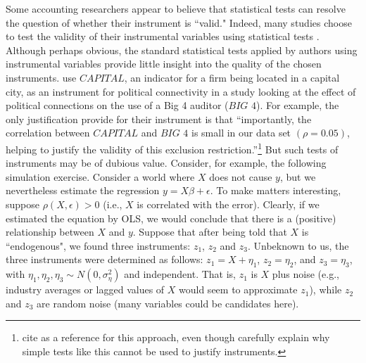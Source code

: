 \documentclass[12pt,reqno,titlepage]{amsart}
\begin{document}
\begin{doublespace}
Some accounting researchers appear to believe that statistical tests can resolve the question of whether their instrument is ``valid."
Indeed, many studies choose to test the validity of their instrumental variables using statistical tests \citep[see][]{Larcker:2010fq}.
%
Although perhaps obvious, the standard statistical tests applied by authors using instrumental variables provide little insight into the quality of the chosen instruments. 
 \citet{Guedhami:2013cj} use $\textit{CAPITAL}$, an indicator for a firm being located in a capital city, as an instrument for political connectivity in a study looking at the effect of political connections on the use of a Big 4 auditor ($\textit{BIG 4}$).
For example, the only justification \citet{Guedhami:2013cj} provide for their instrument is that ``importantly, the correlation between $\textit{CAPITAL}$ and $\textit{BIG 4}$ is small in our data set $(\rho = 0.05)$, helping to justify the validity of this exclusion restriction.''\footnote{
\citet{Guedhami:2013cj} cite \citet{Larcker:2010fq} as a reference for this approach, even though \citet{Larcker:2010fq} carefully explain why simple tests like this cannot be used to justify instruments.}
%
But such tests of instruments may be of dubious value. 
Consider, for example, the following simulation exercise.
Consider a world where $X$ does not cause $y$, but we nevertheless estimate the regression $y = X \beta + \epsilon$. To make matters
interesting, suppose $\rho(X, \epsilon) > 0$ (i.e., $X$ is correlated with the error). Clearly, if we estimated the equation by OLS, we would
conclude that there is a (positive) relationship between $X$ and $y$. Suppose that after being told that $X$ is ``endogenous", we found
three instruments: $z_1$, $z_2$ and $z_3$. Unbeknown to us, the three instruments were determined as follows:
$z_1 = X +\eta_1$, $z_2 = \eta_2$, and $z_3 = \eta_3$, with $\eta_1, \eta_2,  \eta_3 \sim N(0, \sigma_{\eta}^2)$ and independent. 
That is, $z_1$ is $X$ plus noise (e.g., industry averages or lagged values of $X$ would seem to approximate $z_1$), while $z_2$ and $z_3$ are random noise (many variables could be candidates here).


\end{doublespace}
\end{document}
